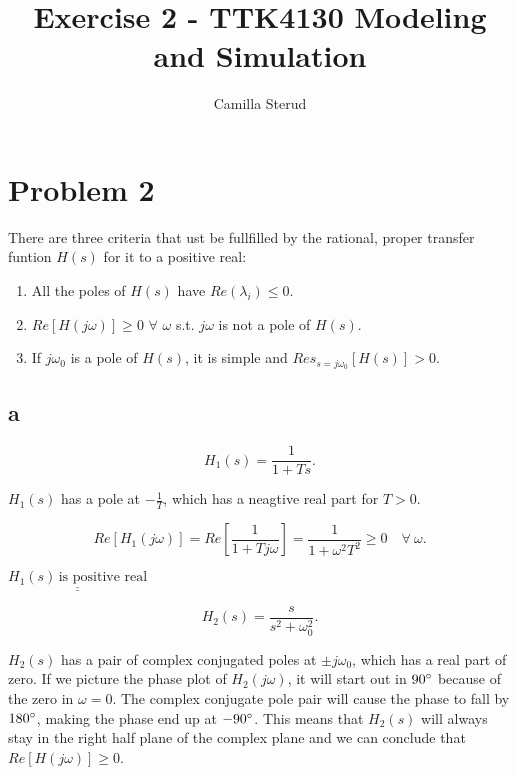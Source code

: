 \documentclass{article}
\title{Exercise 2 - TTK4130 Modeling and Simulation}
\author{Camilla Sterud}
\date{}
\begin{document}
\maketitle

\newpage

\section*{Problem 2}

There are three criteria that ust be fullfilled by the rational, proper transfer funtion $H(s)$ for it to  a positive real:

\begin{enumerate}
\item \label{crit:one} All the poles of $H(s)$ have $Re(\lambda_i) \leq 0$.
\item \label{crit:two} $Re[H(j\omega)] \geq 0$ $\forall$  $\omega$ s.t. $j\omega$ is not a pole of $H(s)$.
\item \label{crit:three} If $j\omega_0$ is a pole of $H(s)$, it is simple and $Res_{s = j\omega_0}[H(s)] > 0$.
\end{enumerate}


\subsection*{a}

\begin{equation*}
	H_1(s) = \frac{1}{1 + Ts}.
\end{equation*}

$H_1(s)$ has a pole at $-\frac{1}{T}$, which has a neagtive real part for $T > 0$.

\begin{equation*}
    Re[H_1(j\omega)] = Re[\frac{1}{1 + Tj\omega}] = \frac{1}{1 + \omega^2T^2} \geq 0 \quad \forall \: \omega.
\end{equation*}

$\underline{\underline{H_1(s) \, \textrm{is positive real}}}$

\begin{equation*}
    H_2(s) = \frac{s}{s^2 + \omega_0^2}.
\end{equation*}

$H_2(s)$ has a pair of complex conjugated poles at $\pm j\omega_0$, which has a real part of zero. If we picture the phase plot of $H_2(j\omega)$, it will start out in $90\degree$ because of the zero in $\omega = 0$. The complex conjugate pole pair will cause the phase to fall by $180\degree$, making the phase end up at $-90\degree$. This means that $H_2(s)$ will always stay in the right half plane of the complex plane and we can conclude that $Re[H(j\omega)] \geq 0$.
\end{document}
